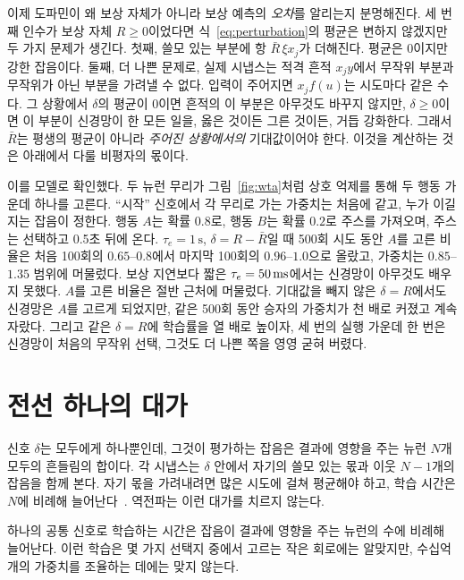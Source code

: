 이제 도파민이 왜 보상 자체가 아니라 보상 예측의 \emph{오차}를 알리는지 분명해진다. 세 번째 인수가 보상 자체 $R\ge0$이었다면 식~\eqref{eq:perturbation}의 평균은 변하지 않겠지만 두 가지 문제가 생긴다. 첫째, 쓸모 있는 부분에 항 $\bar R\,\xi x_j$가 더해진다. 평균은 0이지만 강한 잡음이다. 둘째, 더 나쁜 문제로, 실제 시냅스는 적격 흔적 $x_jy$에서 무작위 부분과 무작위가 아닌 부분을 가려낼 수 없다. 입력이 주어지면 $x_jf(u)$는 시도마다 같은 수다. 그 상황에서 $\delta$의 평균이 0이면 흔적의 이 부분은 아무것도 바꾸지 않지만, $\delta\ge0$이면 이 부분이 신경망이 한 모든 일을, 옳은 것이든 그른 것이든, 거듭 강화한다. 그래서 $\bar R$는 평생의 평균이 아니라 \emph{주어진 상황에서의} 기대값이어야 한다. 이것을 계산하는 것은 아래에서 다룰 비평자의 몫이다.

이를 모델로 확인했다. 두  뉴런 무리가 그림~\ref{fig:wta}처럼 상호 억제를 통해 두 행동 가운데 하나를 고른다. “시작” 신호에서 각 무리로 가는 가중치는 처음에 같고, 누가 이길지는 잡음이 정한다. 행동 $A$는 확률 $0.8$로, 행동 $B$는 확률 $0.2$로 주스를 가져오며, 주스는 선택하고 0.5초 뒤에 온다. $\tau_e=1\,\text{s}$, $\delta=R-\bar R$일 때 500회 시도 동안 $A$를 고른 비율은 처음 100회의 $0.65$--$0.8$에서 마지막 100회의 $0.96$--$1.0$으로 올랐고, 가중치는 $0.85$--$1.35$ 범위에 머물렀다. 보상 지연보다 짧은 $\tau_e=50\,\text{ms}$에서는 신경망이 아무것도 배우지 못했다. $A$를 고른 비율은 절반 근처에 머물렀다. 기대값을 빼지 않은 $\delta=R$에서도 신경망은 $A$를 고르게 되었지만, 같은 500회 동안 승자의 가중치가 천 배로 커졌고 계속 자랐다. 그리고 같은 $\delta=R$에 학습률을 열 배로 높이자, 세 번의 실행 가운데 한 번은 신경망이 처음의 무작위 선택, 그것도 더 나쁜 쪽을 영영 굳혀 버렸다.

\section{전선 하나의 대가}

신호 $\delta$는 모두에게 하나뿐인데, 그것이 평가하는 잡음은 결과에 영향을 주는 뉴런 $N$개 모두의 흔들림의 합이다. 각 시냅스는 $\delta$ 안에서 자기의 쓸모 있는 몫과 이웃 $N-1$개의 잡음을 함께 본다. 자기 몫을 가려내려면 많은 시도에 걸쳐 평균해야 하고, 학습 시간은 $N$에 비례해 늘어난다~\cite{Werfel2005}. 역전파는 이런 대가를 치르지 않는다.

\begin{keyblock}
\begin{proposition}[브로드캐스트의 대가]
\label{prop:broadcastcost}
하나의 공통 신호로 학습하는 시간은 잡음이 결과에 영향을 주는 뉴런의 수에 비례해 늘어난다. 이런 학습은 몇 가지 선택지 중에서 고르는 작은 회로에는 알맞지만, 수십억 개의 가중치를 조율하는 데에는 맞지 않는다.
\end{proposition}
\end{keyblock}

